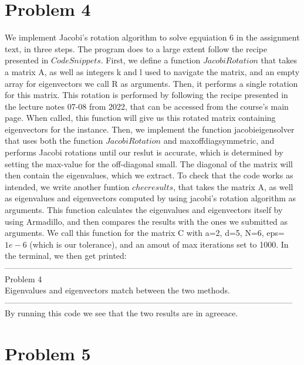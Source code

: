 \documentclass{article} %
\begin{document}
  \section{Problem 4} 
  We implement Jacobi's rotation algorithm to solve egquiation 6 in the assignment text, in three steps. The program does to a large extent
  follow the recipe presented in $Code Snippets$. First, we define a function $JacobiRotation$ that takes a matrix A, as well as integers k and l 
  used to navigate the matrix, and an empty array for eigenvectors we call R as arguments. Then, it performs a single rotation for this matrix. This rotation 
  is performed by following the recipe presented in the lecture notes 07-08 from 2022, that can be accessed from the course's main page.
  When called, this function will give us this rotated matrix containing eigenvectors for the instance. Then, we implement the function jacobieigensolver that uses
  both the function $JacobiRotation$ and maxoffdiagsymmetric, and performs Jacobi rotations until our reslut is accurate, which is determined 
  by setting the max-value for the off-diagonal small. The diagonal of the matrix will then contain the eigenvalues, which we extract.
  To check that the code works as intended, we write another funtion $checresults$, that takes the matrix A, as well as eigenvalues
  and eigenvectors computed by using jacobi's rotation algorithm as arguments. This function calculates the eigenvalues and eigenvectors
  itself by using Armadillo, and then compares the results with the ones we submitted as arguments. We call this function for the matrix C with a=2, d=5, 
  N=6, eps=$1e-6$ (which is our tolerance), and an amout of max iterations set to 1000. In the terminal, we then get printed: \\
  ---------------------------------------------------------------------------------------------------------
  Problem 4 \\
  Eigenvalues and eigenvectors match between the two methods. \\
  --------------------------------------------------------------------------------------------------------- \\
  By running this code we see that the two results are in agreeace. 
  


  \section{Problem 5} 
\end{document}
